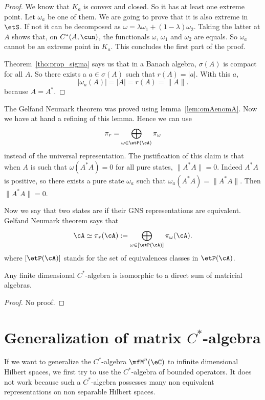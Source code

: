 \begin{proof}
	We know that $K_a$ is convex and closed. So it has at least one extreme point. Let $\omega_a$ be one of them. We are going to prove that it is also extreme in $\etS$. If not it can be decomposed as $\omega=\lambda\omega_1+(1-\lambda)\omega_2$. Taking the latter at $A$ shows that, on $C^*(A,\cun)$, the functionals $\omega$, $\omega_1$ and $\omega_2$ are equals. So $\omega_a$ cannot be an extreme point in $K_a$. This concludes the first part of the proof.


	Theorem~\ref{tho:prop_sigma} says us that in a Banach algebra, $\sigma(A)$ is compact for all $A$. So there exists a $a\in\sigma(A)$ such that $r(A)=| a |$. With this $a$,
	\[
		| \omega_a(A) |=| A |=r(A)=\| A \|.
	\]
	because $A=A^*$.

\end{proof}

The Gelfand Neumark theorem was proved using lemma~\ref{lem:omAenomA}. Now we have at hand a refining of this lemma. Hence we can use
\[
	\pi_r=\bigoplus_{\omega\in\etP(\cA)}\pi_{\omega}
\]
instead of the universal representation. The justification of this claim is that when $A$ is such that $\omega(A^*A)=0$ for all pure states, $\| A^*A \|=0$. Indeed $A^*A$ is positive, so there exists a pure state $\omega_a$ such that $\omega_a(A^*A)=\| A^*A \|$. Then $\| A^*A \|=0$.

Now we say that two states are  if their GNS representations are equivalent. Gelfand Neumark theorem  says that
\[
	\cA\simeq\pi_r(\cA):=\bigoplus_{\omega\in[\etP(\cA)]}\pi_{\omega}(\cA).
\]
where $[\etP(\cA)]$ stands for the set of equivalences classes in $\etP(\cA)$.

\begin{proposition}
	Any finite dimensional $C^*$-algebra is isomorphic to a direct sum of matricial algebras.
\end{proposition}
\begin{proof}
	No proof.
\end{proof}

\section{Generalization of matrix \texorpdfstring{$C^*$}{C}-algebra}

If we want to generalize the $C^*$-algebra $\mfM^n(\eC)$ to infinite dimensional Hilbert spaces, we first try to use the $C^*$-algebra of bounded operators. It does not work because such a $C^*$-algebra possesses many non equivalent representations on non separable Hilbert spaces.

